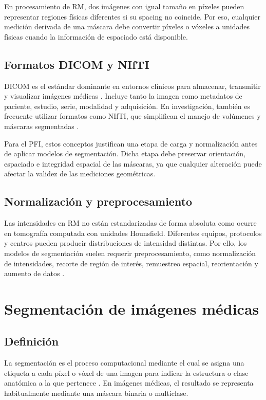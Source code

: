 En procesamiento de RM, dos imágenes con igual tamaño en píxeles pueden representar regiones físicas diferentes si su spacing no coincide. Por eso, cualquier medición derivada de una máscara debe convertir píxeles o vóxeles a unidades físicas cuando la información de espaciado está disponible.

\subsection{Formatos DICOM y NIfTI}

DICOM es el estándar dominante en entornos clínicos para almacenar, transmitir y visualizar imágenes médicas \parencite{nema_dicom_2024}. Incluye tanto la imagen como metadatos de paciente, estudio, serie, modalidad y adquisición. En investigación, también es frecuente utilizar formatos como NIfTI, que simplifican el manejo de volúmenes y máscaras segmentadas \parencite{cox_nifti_2004}.

Para el PFI, estos conceptos justifican una etapa de carga y normalización antes de aplicar modelos de segmentación. Dicha etapa debe preservar orientación, espaciado e integridad espacial de las máscaras, ya que cualquier alteración puede afectar la validez de las mediciones geométricas.

\subsection{Normalización y preprocesamiento}

Las intensidades en RM no están estandarizadas de forma absoluta como ocurre en tomografía computada con unidades Hounsfield. Diferentes equipos, protocolos y centros pueden producir distribuciones de intensidad distintas. Por ello, los modelos de segmentación suelen requerir preprocesamiento, como normalización de intensidades, recorte de región de interés, remuestreo espacial, reorientación y aumento de datos \parencite{litjens_survey_2017,isensee_nnunet_2021}.

\section{Segmentación de imágenes médicas}

\subsection{Definición}

La segmentación es el proceso computacional mediante el cual se asigna una etiqueta a cada píxel o vóxel de una imagen para indicar la estructura o clase anatómica a la que pertenece \parencite{szeliski_computer_vision_2022}. En imágenes médicas, el resultado se representa habitualmente mediante una máscara binaria o multiclase.

